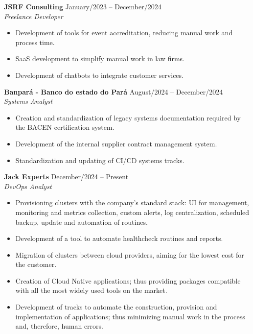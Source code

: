\documentclass[a4paper,10pt]{article}
\newcommand{\entry}[4]{
  \noindent\textbf{#1} \hfill #2 \\
  \noindent\textit{#3} \hfill \textit{#4} \\
  \vspace{2pt}
}
\begin{document}
\vspace{0.6em}

\entry{JSRF Consulting}{\faCalendar \space January/2023 -- December/2024}{Freelance Developer}
\space
\vspace{-1.6em}
\begin{itemize}
\setlength\itemsep{0em}
\item Development of tools for event accreditation, reducing manual work and process time.
\item SaaS development to simplify manual work in law firms.
\item Development of chatbots to integrate customer services.
\end{itemize}

\entry{Banpará - Banco do estado do Pará}{\faCalendar \space August/2024 -- December/2024}{Systems Analyst}
\space
\vspace{-1.6em}
\begin{itemize}
\setlength\itemsep{0em}
\item Creation and standardization of legacy systems documentation required by the BACEN certification system.
\item Development of the internal supplier contract management system.
\item Standardization and updating of CI/CD systems tracks.
\end{itemize}

\entry{Jack Experts}{\faCalendar \space December/2024 -- Present}{DevOps Analyst}
\space
\vspace{-1.6em}
\begin{itemize}
\setlength\itemsep{0em}
\item Provisioning clusters with the company's standard stack: UI for management, monitoring and metrics collection, custom alerts, log centralization, scheduled backup, update and automation of routines.
\item Development of a tool to automate healthcheck routines and reports.
\item Migration of clusters between cloud providers, aiming for the lowest cost for the customer.
\item Creation of Cloud Native applications; thus providing packages compatible with all the most widely used tools on the market.
\item Development of tracks to automate the construction, provision and implementation of applications; thus minimizing manual work in the process and, therefore, human errors.
\end{itemize}
\end{document}
